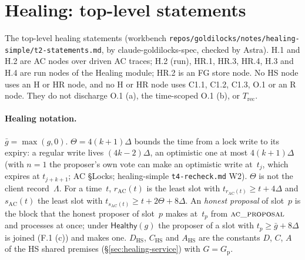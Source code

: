 \documentclass{article}
\newcommand{\fname}[1]{\text{\textsc{#1}}}
\begin{document}
\section{Healing: top-level statements}\label{sec:healing-top}

The top-level healing statements (workbench
\texttt{repos/goldilocks/notes/healing-simple/t2-statements.md}, by
claude-goldilocks-spec, checked by Astra).  H.1 and H.2 are AC nodes over
driven AC traces; H.2 (run), HR.1, HR.3, HR.4, H.3 and H.4 are run nodes of
the Healing module; HR.2 is an FG store node.  No HS node uses an H or HR
node, and no H or HR node uses C1.1, C1.2, C1.3, O.1 or an R node.  They do
not discharge O.1 (a), the time-scoped O.1 (b), or $T_{\mathrm{rec}}$.

\paragraph{Healing notation.}  $\bar g=\max(g,0)$.  $\Theta=4(k+1)\Delta$
bounds the time from a lock write to its expiry: a regular write lives
$(4k-2)\Delta$, an optimistic one at most $4(k+1)\Delta$ (with $n=1$ the
proposer's own vote can make an optimistic write at~$t_j$, which expires at
$t_{j+k+1}$; AC \S Locks; healing-simple \texttt{t4-recheck.md} W2).
$\Theta$ is not the client record~$\Lambda$.  For a time~$t$,
$r_{\mathrm{AC}}(t)$ is the least slot with $t_{r_{\mathrm{AC}}(t)}\geq
t+4\Delta$ and $s_{\mathrm{AC}}(t)$ the least slot with
$t_{s_{\mathrm{AC}}(t)}\geq t+2\Theta+8\Delta$.  An \emph{honest proposal} of
slot~$p$ is the block that the honest proposer of slot~$p$ makes at~$t_p$
from $\fname{ac\_proposal}$ and processes at once; under
$\mathsf{Healthy}(g)$ the proposer of a slot with $t_p\geq\bar g+8\Delta$ is
joined (F.1 (c)) and makes one.  $D_{\mathrm{HS}}$, $C_{\mathrm{HS}}$ and
$A_{\mathrm{HS}}$ are the constants $D$, $C$, $A$ of the HS shared premises
(\S\ref{sec:healing-service}) with $G=G_{\mathrm p}$.
\end{document}

